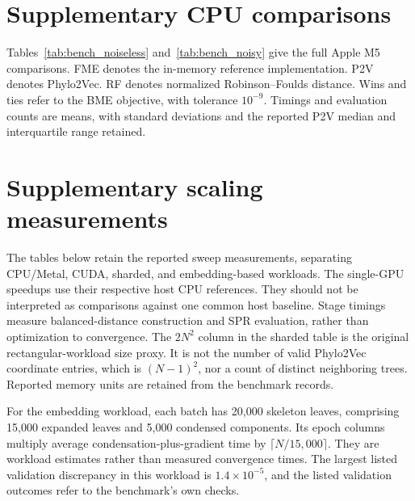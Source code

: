 \section{Supplementary CPU comparisons}
\label{sec:cpu_tables}

Tables~\ref{tab:bench_noiseless} and~\ref{tab:bench_noisy} give the full Apple M5 comparisons.
FME denotes the in-memory reference implementation.
P2V denotes Phylo2Vec.
RF denotes normalized Robinson--Foulds distance.
Wins and ties refer to the BME objective, with tolerance $10^{-9}$.
Timings and evaluation counts are means, with standard deviations and the reported P2V median and interquartile range retained.



\clearpage
\section{Supplementary scaling measurements}
\label{sec:scaling_tables}

The tables below retain the reported sweep measurements, separating CPU/Metal, CUDA, sharded, and embedding-based workloads.
The single-GPU speedups use their respective host CPU references.
They should not be interpreted as comparisons against one common host baseline.
Stage timings measure balanced-distance construction and SPR evaluation, rather than optimization to convergence.
The $2N^2$ column in the sharded table is the original rectangular-workload size proxy.
It is not the number of valid Phylo2Vec coordinate entries, which is $(N-1)^2$, nor a count of distinct neighboring trees.
Reported memory units are retained from the benchmark records.

For the embedding workload, each batch has 20,000 skeleton leaves, comprising 15,000 expanded leaves and 5,000 condensed components.
Its epoch columns multiply average condensation-plus-gradient time by
$\lceil N/15{,}000\rceil$.
They are workload estimates rather than measured convergence times.
The largest listed validation discrepancy in this workload is $1.4\times10^{-5}$, and the listed validation outcomes refer to the benchmark's own checks.


